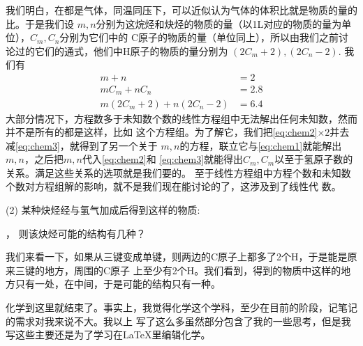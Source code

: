我们明白，在都是气体，同温同压下，可以近似认为气体的体积比就是物质的量的比。于是我们设
$m,n$分别为这烷烃和炔烃的物质的量（以1L对应的物质的量为单位），$C_m, C_n$分别为它们中的
C原子的物质的量（单位同上），所以由我们之前讨论过的它们的通式，他们中H原子的物质的量分别为
$(2C_m + 2), (2C_n - 2)$.
我们有
\begin{align}
m+n &= 2 \label{eq:chem1} \\
mC_m + nC_n &= 2.8 \label{eq:chem2} \\
m(2C_m + 2) + n(2C_n - 2) &= 6.4 \label{eq:chem3}
\end{align}
大部分情况下，方程数多于未知数个数的线性方程组中无法解出任何未知数，然而并不是所有的都是这样，比如
这个方程组。为了解它，我们把\ref{eq:chem2}$\times 2$并去减\ref{eq:chem3}，就得到了另一个关于
$m,n$的方程，联立它与\ref{eq:chem1}就能解出$m,n$，之后把$m,n$代入\ref{eq:chem2}和
\ref{eq:chem3}就能得出$C_m,C_m$以至于氢原子数的关系。满足这些关系的选项就是我们要的。
至于线性方程组中方程个数和未知数个数对方程组解的影响，就不是我们现在能讨论的了，这涉及到了线性代
数。

(2) 某种炔烃经与氢气加成后得到这样的物质:
\begin{center}
\end{center}，
则该炔烃可能的结构有几种？

我们来看一下，如果从三键变成单键，则两边的C原子上都多了2个H，于是能是原来三键的地方，周围的C原子
上至少有2个H。我们看到，得到的物质中这样的地方只有一处，在中间，于是可能的结构只有一种。

化学到这里就结束了。事实上，我觉得化学这个学科，至少在目前的阶段，记笔记的需求对我来说不大。我以上
写了这么多虽然部分包含了我的一些思考，但是我写这些主要还是为了学习在\LaTeX 里编辑化学。